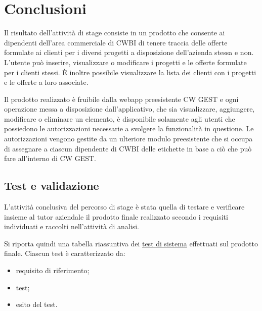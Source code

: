 \chapter{Conclusioni}
\label{cap:conclusioni}


\setlength{\parskip}{3ex}

\noindent Il risultato dell'attività di stage consiste in un prodotto che consente ai dipendenti dell'area commerciale di CWBI di tenere traccia delle offerte formulate ai clienti per i diversi progetti a disposizione dell'azienda stessa e non. L'utente può inserire, visualizzare o modificare i progetti e le offerte formulate per i clienti stessi. È inoltre possibile visualizzare la lista dei clienti con i progetti e le offerte a loro associate. 

\setlength{\parskip}{3ex}

\noindent Il prodotto realizzato è fruibile dalla webapp preesistente CW GEST e ogni operazione messa a disposizione dall'applicativo, che sia visualizzare, aggiungere, modificare o eliminare un elemento, è disponibile solamente agli utenti che possiedono le autorizzazioni necessarie a svolgere la funzionalità in questione. Le autorizzazioni vengono gestite da un ulteriore modulo preesistente che si occupa di assegnare a ciascun dipendente di CWBI delle etichette in base a ciò che può fare all'interno di CW GEST.


\section{Test e validazione}
L'attività conclusiva del percorso di stage è stata quella di testare e verificare insieme al tutor aziendale il prodotto finale realizzato secondo i requisiti individuati e raccolti nell'attività di analisi.

\setlength{\parskip}{3ex} 

\noindent Si riporta quindi una tabella riassuntiva dei {\hyperref[para:test-definition]{test di sistema}}\glsfirstoccur \; effettuati sul prodotto finale. Ciascun test è caratterizzato da:
\begin{itemize}
\item requisito di riferimento;
\item test;
\item esito del test.
\end{itemize}


